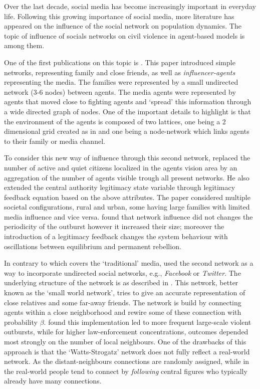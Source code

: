 \documentclass[10pt]{article}
\begin{document}
    Over the last decade, social media has become increasingly important in everyday life. Following this growing importance of social media, more literature has appeared on the influence of the social network on population dynamics. The topic of influence of socials networks on civil violence in agent-based models is among them.

    One of the first publications on this topic is \cite{lemos2015}. This paper introduced simple networks, representing family and close friends, as well as \textit{influencer-agents} representing the media. The families were represented by a small undirected network (3-6 nodes) between agents. The media agents were represented by agents that moved close to fighting agents and `spread' this information through a wide directed graph of nodes. One of the important details to highlight is that the environment of the agents is composed of two lattices, one being a 2 dimensional grid created as in \cite{epstein2002} and one being a node-network which links agents to their family or media channel.

    To consider this new way of influence through this second network, \cite{lemos2015} replaced the number of active and quiet citizens localized in the agents vision area by an aggregation of the number of agents visible trough all present networks. He also extended the central authority legitimacy state variable through legitimacy feedback equation based on the above attributes. The paper considered multiple societal configurations, rural and urban, some having large families with limited media influence and vice versa.
    \cite{lemos2015} found that network influence did not changes the periodicity of the outburst however it increased their size; moreover the introduction of a legitimacy feedback changes the system behaviour with oscillations between equilibrium and permanent rebellion.

    In contrary to \cite{lemos2015} which covers the `traditional' media, \cite{fonoberova2019} used the second network as a way to incorporate undirected social networks, e.g., \textit{Facebook} or \textit{Twitter}. The underlying structure of the network is as described in \cite{watts1998}. This network, better known as the `small world network', tries to give an accurate representation of close relatives and some far-away friends. The network is build by connecting agents within a close neighborhood and rewire some of these connection with probability $\beta$. \cite{fonoberova2019} found this implementation led to more frequent large-scale violent outbursts, while for higher law-enforcement concentrations, outcomes depended most strongly on the number of local neighbours. One of the drawbacks of this approach is that the `Watts-Strogatz' network does not fully reflect a real-world network. As the distant-neighbours connections are randomly assigned, while in the real-world people tend to connect by \textit{following} central figures who typically already have many connections.
\end{document}
